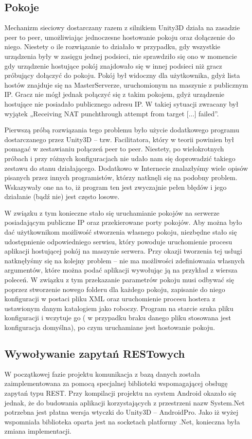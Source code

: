 \subsection{Pokoje}
Mechanizm sieciowy dostarczany razem z silnikiem Unity3D działa na zasadzie peer to peer, umożliwiając jednoczesne hostowanie pokoju oraz dołączenie do niego. Niestety o ile rozwiązanie to działało w przypadku, gdy wszystkie urządzenia były w zasięgu jednej podsieci, nie sprawdziło się ono w momencie gdy urządzenie hostujące pokój znajdowało się w innej podsieci niż gracz próbujący dołączyć do pokoju. Pokój był widoczny dla użytkownika, gdyż lista hostów znajduje się na MasterServerze, uruchomionym na maszynie z publicznym IP. Gracz nie mógł jednak połączyć się z takim pokojem, gdyż urządzenie hostujące nie posiadało publicznego adresu IP. W takiej sytuacji zwracany był wyjątek „Receiving NAT punchthrough attempt from target [...] failed”.

Pierwszą próbą rozwiązania tego problemu było użycie dodatkowego programu dostarczanego przez Unity3D – tzw. Facilitatora, który w teorii powinien był pomagać w zestawianiu połączeń peer to peer. Niestety, po wielokrotnych próbach i przy różnych konfiguracjach nie udało nam się doprowadzić takiego zestawu do stanu działającego. Dodatkowo w Internecie znalazłyśmy wiele opisów pisanych przez innych programistów, którzy natknęli się na podobny problem. Wskazywały one na to, iż program ten jest zwyczajnie pełen błędów i jego działanie (bądź nie) jest często losowe.

W związku z tym konieczne stało się uruchamianie pokojów na serwerze posiadającym publiczne IP oraz przekierowane porty pokojów. Aby można było dać użytkownikom możliwość stworzenia własnego pokoju, niezbędne stało się udostępnienie odpowiedniego serwisu, który powoduje uruchomienie procesu aplikacji hostującej pokój na maszynie serwera. Przy okazji tworzenia tej usługi natknęłyśmy się na kolejny problem – nie ma możliwości zdefiniowania własnych argumentów, które można podać aplikacji wywołując ją na przykład z wiersza poleceń. W związku z tym przekazanie parametrów pokoju musi odbywać się poprzez stworzenie nowego folderu dla każdego pokoju, zapisanie do niego konfiguracji w postaci pliku XML oraz uruchomienie procesu hostera z ustawionym danym katalogiem jako roboczy. Program na starcie szuka pliku konfiguracji i wczytuje go ( w przypadku braku danego pliku stosowana jest konfiguracja domyślna), po czym uruchamiane jest hostowanie pokoju.

\subsection{Wywoływanie zapytań RESTowych}
W początkowej fazie projektu komunikacja z bazą danych została zaimplementowana za pomocą specjalnej biblioteki wspomagającej obsługę zapytań typu REST. Przy kompilacji projektu na system Android okazało się jednak, że do budowania aplikacji korzystających z przestrzeni nazw System.Net potrzebna jest płatna wersja wtyczki do Unity3D – AndroidPro. Jako iż wyżej wspomniała biblioteka oparta jest na socketach platformy .Net, konieczna była zmiana implementacji. 

